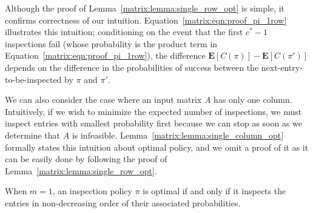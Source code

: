  Although the proof of Lemma~\ref{matrix:lemma:single_row_opt} is simple, it confirms correctness of our intuition. Equation~\ref{matrix:eqn:proof_pi_1row} illustrates this intuition; conditioning on the event that the first $c^*-1$ inspections fail (whose probability is the product term in Equation~\ref{matrix:eqn:proof_pi_1row}), the difference $\mathbf{E}[C(\pi)] - \mathbf{E}[C(\pi')]$ depends on the difference in the probabilities of success between the next-entry-to-be-inspected by $\pi$ and $\pi'$.

 We can also consider the case where an input matrix $A$ has only one column.
 Intuitively, if we wish to minimize the expected number of inspections, we must inspect entries with smallest probability first because we can stop as soon as we determine that $A$ is infeasible.
 Lemma~\ref{matrix:lemma:single_column_opt} formally states this intuition about optimal policy, and we omit a proof of it as it can be easily done by following the proof of Lemma~\ref{matrix:lemma:single_row_opt}. %
 \begin{lemma} \label{matrix:lemma:single_column_opt}
 When $m = 1$, an inspection policy $\pi$ is optimal if and only if it inspects the entries in non-decreasing order of their associated probabilities.
 \end{lemma}



